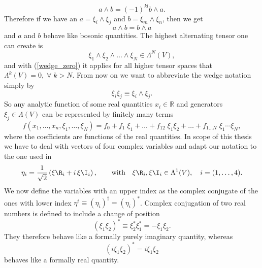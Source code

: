 \begin{equation}
a\wedge b = (-1)^{kl} b\wedge a.
\end{equation}
Therefore if we have an $a=\xi_{i}\wedge\xi_{j}$ and $b=\xi_{m}\wedge\xi_{n}$, then we get
\begin{equation}
a \wedge b = b \wedge a
\end{equation}
and $a$ and $b$ behave like bosonic quantities. The highest alternating tensor one can create is
\begin{equation}
\xi_{1}\wedge\xi_{2}\wedge \ldots\wedge \xi_{N} \in \Lambda^{N}(V),
\end{equation}
and with (\ref{wedge_zero}) it applies for all higher tensor spaces that $\Lambda^{k}(V)=0,\; \forall\; k>N$. From now on we want to abbreviate the wedge notation simply by
\begin{equation}
\xi_{i}\xi_{j} \equiv \xi_{i}\wedge\xi_{j}.
\end{equation}
So any analytic function of some real quantities $x_{i} \in \mathbb{R}$ and  generators $\xi_{j} \in \Lambda(V)$ can be represented by finitely many terms
\begin{equation}
f(x_{1},\ldots,x_{n},\xi_{1},\ldots,\xi_{N}) = f_{0} + f_{1}\;\xi_{1} +\ldots+ f_{12}\;\xi_{1}\xi_{2} +\ldots+ f_{1\ldots N}\; \xi_{1}\cdots\xi_{N},
\end{equation}
where the coefficients are functions of the real quantities. In scope of this thesis we have to deal with vectors of four complex  variables and adapt our notation to the one used in \cite{Giombi:2009gd}
\begin{equation}
\eta_{i} =\frac{1}{\sqrt{2}} \left(\xi\R_{i} +i\,\xi\I_{i}\right),\qquad \text{with} \quad \xi\R_{i},\xi\I_{i} \in \Lambda^{1}(V), \quad i=(1,\ldots,4).
\end{equation}
We now define the  variables with an upper index as the complex conjugate of the ones with lower index $\eta^{i}\equiv \left(\eta_{i}\right)^{\dagger} = \left(\eta_{i}\right)^{\ast}$. Complex conjugation of two real  numbers is defined to include a change of position
\begin{equation}
\left(\xi_{1}\xi_{2}\right)^{\ast}\equiv \xi_{2}^{\ast}\xi_{1}^{\ast} = -\xi_{1}\xi_{2}.
\end{equation}
They therefore behave like a formally purely imaginary quantity, whereas
\begin{equation}
\left(i\xi_{1}\xi_{2}\right)^{\ast} = i\xi_{1}\xi_{2}
\end{equation}
behaves like a formally real quantity.
%
%
%
%
%
%
%
%
%
